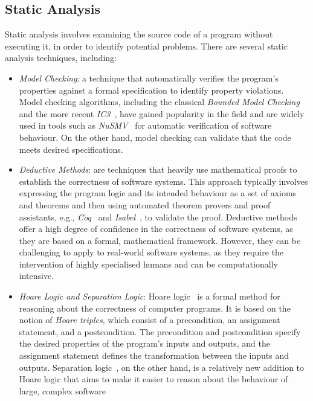 \subsection{Static Analysis}
Static analysis involves examining the source code of a program without executing it,
in order to identify potential problems.
There are several static analysis techniques, including:
\begin{itemize}
  \item \emph{Model Checking}: a technique that automatically verifies the program's properties 
  against a formal speciﬁcation to identify property violations. Model checking algorithms,
  including the classical \emph{Bounded Model Checking}\cite{Clarke1999BoundedMC} and the more recent
  \emph{IC3}~\cite{bradley2012understanding}, have gained popularity in the field and
  are widely used in tools such as \emph{NuSMV}~\cite{cavada2014nuxmv} for automatic
  verification of software behaviour.
  On the other hand, model checking can validate that the code meets desired speciﬁcations.
  \item \emph{Deductive Methods}: are techniques that heavily use mathematical proofs
  to establish the correctness of software systems. This approach typically involves
  expressing the program logic and its intended behaviour as a set of axioms and theorems
  and then using automated theorem provers and proof assistants, e.g.,
  \emph{Coq}~\cite{bertot2013interactive} and \emph{Isabel}~\cite{Nipkow2002Isabelle}, to validate the proof.
  Deductive methods offer a high degree of confidence in the correctness of
  software systems, as they are based on a formal, mathematical framework.
  However, they can be challenging to apply to real-world software systems, as they
  require the intervention of highly specialised humans and can be computationally intensive.
  \item \emph{Hoare Logic and Separation Logic}: Hoare logic~\cite{hoare1969axiomatic} is a formal method
  for reasoning about the correctness of computer programs. It is based on the notion of \emph{Hoare triples}, which consist of a
  precondition, an assignment statement, and a postcondition. The precondition
  and postcondition specify the desired properties of the program's inputs and
  outputs, and the assignment statement defines the transformation between the inputs and outputs.
  Separation logic~\cite{reynolds2002separation}, on the other hand, is a relatively new addition to Hoare logic
  that aims to make it easier to reason about the behaviour of large, complex software

\end{itemize}
